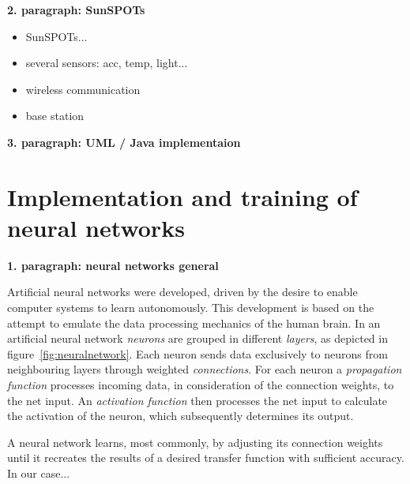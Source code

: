 \documentclass[12pt]{scrartcl}
\begin{document}


\textbf{2. paragraph: SunSPOTs}

\begin{itemize}
\item SunSPOTs...
\item several sensors: acc, temp, light...
\item wireless communication
\item base station
\end{itemize}

\textbf{3. paragraph: UML / Java implementaion}

\newpage


\section*{Implementation and training of neural networks}

\textbf{1. paragraph: neural networks general}


Artificial neural networks were developed, driven by the desire to enable computer systems to learn autonomously.
This development is based on the attempt to emulate the data processing mechanics of the human brain. %
In an artificial neural network \emph{neurons} are grouped in different \emph{layers}, as depicted in figure~\ref{fig:neuralnetwork}. 
Each neuron sends data exclusively to neurons from neighbouring layers through weighted \emph{connections}.
For each neuron a \emph{propagation function} processes incoming data, in consideration of the connection weights, to the net input.
An \emph{activation function} then processes the net input to calculate the activation of the neuron, which subsequently determines its output. \cite{KrieselNN}

A neural network learns, most commonly, by adjusting its connection weights until it recreates the results of a desired transfer function with sufficient accuracy.
In our case...
\end{document}

